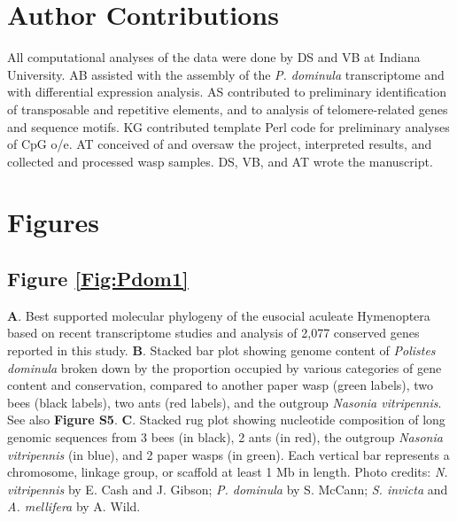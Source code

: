 \section{Author Contributions}

All computational analyses of the data were done by DS and VB at Indiana
University. AB assisted with the assembly of the \textit{P. dominula}
transcriptome and with differential expression analysis. AS contributed
to preliminary identification of transposable and repetitive elements,
and to analysis of telomere-related genes and sequence motifs. KG
contributed template Perl code for preliminary analyses of CpG o/e. AT
conceived of and oversaw the project, interpreted results, and collected
and processed wasp samples. DS, VB, and AT wrote the manuscript.

\section{Figures}

\subsection*{Figure \ref{Fig:Pdom1}}
\noindent
\textbf{A}. Best supported molecular phylogeny of the eusocial aculeate Hymenoptera based on recent transcriptome studies and analysis of 2,077 conserved genes reported in this study.
\textbf{B}. Stacked bar plot showing genome content of \textit{Polistes dominula} broken down by the proportion occupied by various categories of gene content and conservation, compared to another paper wasp (green labels), two bees (black labels), two ants (red labels), and the outgroup \textit{Nasonia vitripennis}. See also \textbf{Figure S5}.
\textbf{C}. Stacked rug plot showing nucleotide composition of long genomic sequences from 3 bees (in black), 2 ants (in red), the outgroup
\textit{Nasonia vitripennis} (in blue), and 2 paper wasps (in green). Each vertical bar represents a chromosome, linkage group, or scaffold at least 1 Mb in length.
Photo credits: \textit{N. vitripennis} by E. Cash and J. Gibson;
\textit{P. dominula} by S. McCann; \textit{S. invicta} and \textit{A. mellifera} by A. Wild.

